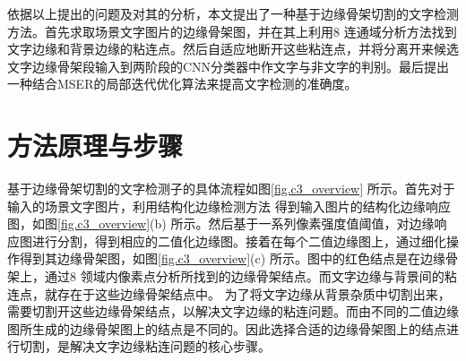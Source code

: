     依据以上提出的问题及对其的分析，本文提出了一种基于边缘骨架切割的文字检测方法。首先求取场景文字图片的边缘骨架图，并在其上利用8 连通域分析方法找到文字边缘和背景边缘的粘连点。然后自适应地断开这些粘连点，并将分离开来候选文字边缘骨架段输入到两阶段的CNN分类器中作文字与非文字的判别。最后提出一种结合MSER的局部迭代优化算法来提高文字检测的准确度。

    \section{方法原理与步骤}

    基于边缘骨架切割的文字检测子的具体流程如图\ref{fig.c3_overview} 所示。首先对于输入的场景文字图片，利用结构化边缘检测方法\cite{Dollar2015Fast} 得到输入图片的结构化边缘响应图，如图\ref{fig.c3_overview}(b) 所示。然后基于一系列像素强度值阈值，对边缘响应图进行分割，得到相应的二值化边缘图。接着在每个二值边缘图上，通过细化操作得到其边缘骨架图，如图\ref{fig.c3_overview}(c) 所示。图中的红色结点是在边缘骨架上，通过8 领域内像素点分析所找到的边缘骨架结点。而文字边缘与背景间的粘连点，就存在于这些边缘骨架结点中。
    为了将文字边缘从背景杂质中切割出来，需要切割开这些边缘骨架结点，以解决文字边缘的粘连问题。而由不同的二值边缘图所生成的边缘骨架图上的结点是不同的。因此选择合适的边缘骨架图上的结点进行切割，是解决文字边缘粘连问题的核心步骤。

